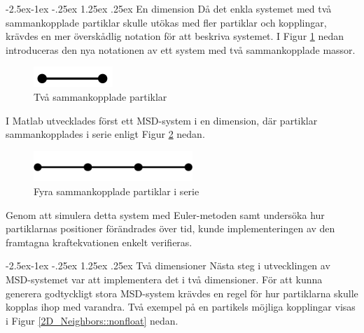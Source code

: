 \documentclass[a4paper,12pt,oneside,final,swedish]{extarticle}
\makeatletter
\renewcommand\paragraph{\@startsection{paragraph}{4}{\z@}%
            {-2.5ex\@plus -1ex \@minus -.25ex}%
            {1.25ex \@plus .25ex}%
            {\normalfont\normalsize\bfseries}}
\makeatother
\begin{document}
\paragraph{En dimension}
Då det enkla systemet med två sammankopplade partiklar skulle utökas med fler partiklar och kopplingar, krävdes en mer överskådlig notation för att beskriva systemet. 
I Figur \ref{2D_simple::nonfloat} nedan introduceras den nya notationen av ett system med två sammankopplade massor.

\begin{figure}[h!]
  \begin{center}
    \includegraphics[width=3cm]{Bilder/2D_simple.png} 
  \end{center}
  \caption{Två sammankopplade partiklar}
  \label{2D_simple::nonfloat}
\end{figure}
\noindent I Matlab utvecklades först ett MSD-system i en dimension, där partiklar sammankopplades i serie enligt Figur \ref{simple1D4::nonfloat} nedan.
\begin{figure}[h!]
  \begin{center}
    \includegraphics[width=6cm]{Bilder/simple1D4.png} 
  \end{center}
  \caption{Fyra sammankopplade partiklar i serie}
  \label{simple1D4::nonfloat}
\end{figure}

Genom att simulera detta system med Euler-metoden samt undersöka hur partiklarnas positioner förändrades över tid, kunde implementeringen av den framtagna kraftekvationen enkelt verifieras.

\paragraph{Två dimensioner}
Nästa steg i utvecklingen av MSD-systemet var att implementera det i två dimensioner. För att kunna generera godtyckligt stora MSD-system krävdes en regel för hur partiklarna skulle kopplas ihop med varandra. Två exempel på en partikels möjliga kopplingar visas i Figur \ref{2D_Neighbors::nonfloat} nedan.
\end{document}
